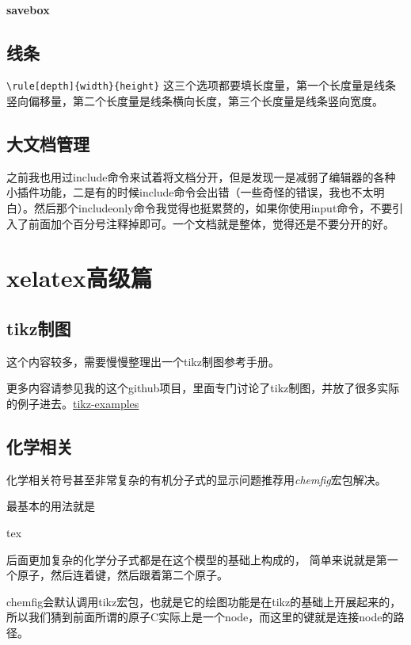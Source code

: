 \documentclass[11pt,oneside]{book}
\begin{document}
\subsection{savebox}


\chapter{线条}
\verb+\rule[depth]{width}{height}+
这三个选项都要填长度量，第一个长度量是线条竖向偏移量，第二个长度量是线条横向长度，第三个长度量是线条竖向宽度。

\chapter{大文档管理}
之前我也用过include命令来试着将文档分开，但是发现一是减弱了编辑器的各种小插件功能，二是有的时候include命令会出错（一些奇怪的错误，我也不太明白）。然后那个includeonly命令我觉得也挺累赘的，如果你使用input命令，不要引入了前面加个百分号注释掉即可。一个文档就是整体，觉得还是不要分开的好。


\part{xelatex高级篇}
\chapter{tikz制图}
这个内容较多，需要慢慢整理出一个tikz制图参考手册。

更多内容请参见我的这个github项目，里面专门讨论了tikz制图，并放了很多实际的例子进去。\href{https://github.com/a358003542/tikz-examples}{tikz-examples}


\chapter{化学相关}
化学相关符号甚至非常复杂的有机分子式的显示问题推荐用\emph{chemfig}宏包解决。

最基本的用法就是
\begin{tcbcode}{tex}
\end{tcbcode}


后面更加复杂的化学分子式都是在这个模型的基础上构成的， 简单来说就是第一个原子，然后连着键，然后跟着第二个原子。

chemfig会默认调用tikz宏包，也就是它的绘图功能是在tikz的基础上开展起来的，所以我们猜到前面所谓的原子C实际上是一个node，而这里的键就是连接node的路径。
\end{document}
